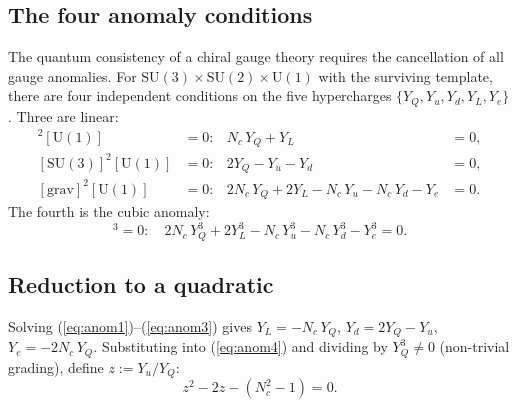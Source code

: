 \documentclass[11pt,a4paper]{article}
\theoremstyle{definition}
\newcommand{\SU}{\mathrm{SU}}
\newcommand{\U}{\mathrm{U}}
\begin{document}

\subsection{The four anomaly conditions}
\label{sec:anomaly_conditions}

The quantum consistency of a chiral gauge theory requires the
cancellation of all gauge anomalies.  For
$\SU(3) \times \SU(2) \times \U(1)$ with the surviving template, there
are four independent conditions on the five hypercharges
$\{Y_Q, Y_u, Y_d, Y_L, Y_e\}$.  Three are linear:
\begin{align}
  [\SU(2)]^2[\U(1)] &= 0: &
    N_c\, Y_Q + Y_L &= 0, \label{eq:anom1} \\
  [\SU(3)]^2[\U(1)] &= 0: &
    2Y_Q - Y_u - Y_d &= 0, \label{eq:anom2} \\
  [\mathrm{grav}]^2[\U(1)] &= 0: &
    2N_c\, Y_Q + 2Y_L - N_c\, Y_u - N_c\, Y_d - Y_e &= 0. \label{eq:anom3}
\end{align}
The fourth is the cubic anomaly:
\begin{equation}
  [\U(1)]^3 = 0: \quad
  2N_c\, Y_Q^3 + 2Y_L^3 - N_c\, Y_u^3 - N_c\, Y_d^3 - Y_e^3 = 0.
  \label{eq:anom4}
\end{equation}

\subsection{Reduction to a quadratic}
\label{sec:reduction_quadratic}

Solving (\ref{eq:anom1})--(\ref{eq:anom3}) gives
$Y_L = -N_c\, Y_Q$, $Y_d = 2Y_Q - Y_u$, $Y_e = -2N_c\, Y_Q$.
Substituting into (\ref{eq:anom4}) and dividing by $Y_Q^3 \ne 0$
(non-trivial grading), define $z := Y_u / Y_Q$:
\begin{equation}
  z^2 - 2z - (N_c^2 - 1) = 0.
  \label{eq:z_quadratic}
\end{equation}
\end{document}
